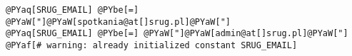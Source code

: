 \begin{Verbatim}[commandchars=@\[\]]
@PYaq[SRUG_EMAIL] @PYbe[=] @PYaW["]@PYaW[spotkania@at[]srug.pl]@PYaW["]
@PYaq[SRUG_EMAIL] @PYbe[=] @PYaW["]@PYaW[admin@at[]srug.pl]@PYaW["]
@PYaf[# warning: already initialized constant SRUG_EMAIL]
\end{Verbatim}
